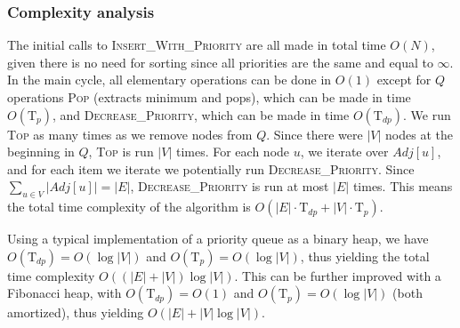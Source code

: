 \documentclass{report}[a4paper]
\theoremstyle{remark}
\begin{document}
\subsubsection{Complexity analysis}
The initial calls to \textsc{Insert\_With\_Priority} are all made in total time $O(N)$, given there is no need for sorting since all priorities are the same and equal to $\infty$. In the main cycle, all elementary operations can be done in $O(1)$ except for $Q$ operations \textsc{Pop} (extracts minimum and pops), which can be made in time $O(\text{T}_{p})$, and \textsc{Decrease\_Priority}, which can be made in time $O(\text{T}_{dp})$. We run \textsc{Top} as many times as we remove nodes from $Q$. Since there were $|V|$ nodes at the beginning in $Q$, \textsc{Top} is run $|V|$ times. For each node $u$, we iterate over $Adj[u]$, and for each item we iterate we potentially run \textsc{Decrease\_Priority}. Since $\sum_{u \in V}{|Adj[u]|} = |E|$, \textsc{Decrease\_Priority} is run at most $|E|$ times.
This means the total time complexity of the algorithm is $O(|E|\cdot \text{T}_{dp}+|V|\cdot \text{T}_{p})$. \par
Using a typical implementation of a priority queue as a binary heap, we have $O(\text{T}_{dp})=O(\log |V|)$ and $O(\text{T}_{p})=O(\log |V|)$, thus yielding the total time complexity $O((|E|+|V|)\log |V|)$. This can be further improved with a Fibonacci heap, with $O(\text{T}_{dp})=O(1)$ and $O(\text{T}_{p})=O(\log |V|)$ (both amortized), thus yielding $O(|E| + |V|\log |V|)$.
\end{document}
